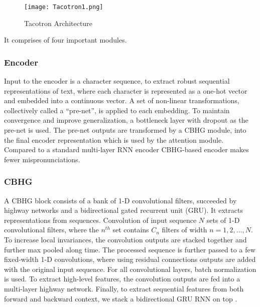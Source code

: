 \documentclass[runningheads]{llncs}
\begin{document}
\begin{figure}[htbp]
\centerline{\texttt{[image: Tacotron1.png]}}
\caption{Tacotron Architecture \cite{ref_paper3}}
\end{figure}

It comprises of four important modules.
\subsubsection{Encoder}
Input to the encoder is a character sequence, to extract robust sequential representations of text, where each character is represented as a one-hot vector and embedded into a continuous vector. A set of non-linear transformations, collectively called a “pre-net”, is applied to each embedding. To maintain convergence and improve generalization, a bottleneck layer with dropout as the pre-net is used. The pre-net outputs are transformed by a CBHG module, into the final encoder representation which is used by the attention module. Compared to a standard multi-layer RNN encoder CBHG-based encoder makes fewer mispronunciations\cite{ref_paper3}. 

\subsubsection{CBHG}
A CBHG block consists of a bank of 1-D convolutional filters, succeeded by highway networks and a bidirectional gated recurrent unit (GRU). It extracts representations from sequences. Convolution of input sequence $N$ sets of 1-D convolutional filters, where the
$n^{th}$ set contains $C_n$ filters of width $n = 1, 2, . . . ,N$. To increase local invariances, the convolution outputs are stacked together and further max pooled along time. The processed sequence is further passed to a few fixed-width 1-D convolutions, where using residual connections  outputs are added with the original input sequence. For all convolutional layers, batch normalization is used. To extract high-level features, the convolution outputs are fed into a multi-layer highway network. Finally, to extract sequential features from both forward and backward context, we stack a bidirectional GRU RNN on top \cite{ref_paper3}.
\end{document}
